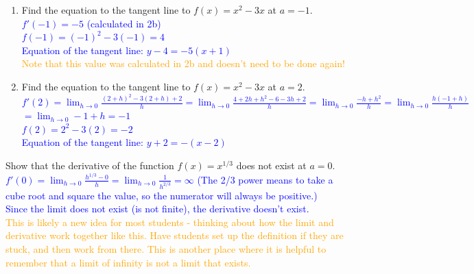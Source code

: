 \documentclass{ximera}
\begin{document}
    \begin{exercise} 
        \begin{enumerate}
            \item Find the equation to the tangent line to $f(x)=x^2-3x$ at $a=-1$.\\
            \textcolor{blue}{$f'(-1)=-5$ (calculated in 2b)\\
                $f(-1)=(-1)^2-3(-1)=4$\\
                Equation of the tangent line: $y-4=-5(x+1)$}\\
            \textcolor{orange}{Note that this value was calculated in 2b and doesn't need to be done again! }
            \item Find the equation to the tangent line to $f(x)=x^2-3x$ at $a=2$.\\
            \textcolor{blue}{$f'(2)=\displaystyle\lim_{h\rightarrow 0}\frac{(2+h)^2-3(2+h)+2}{h}=\lim_{h\rightarrow 0}\frac{4+2h+h^2-6-3h+2}{h}=\lim_{h\rightarrow 0}\frac{-h+h^2}{h}=\lim_{h\rightarrow 0}\frac{h(-1+h)}{h}$\\
            $=\displaystyle \lim_{h\rightarrow 0} -1+h=-1$\\
            $f(2)=2^2-3(2)=-2$\\
            Equation of the tangent line: $y+2=-(x-2)$}
        \end{enumerate}
    \end{exercise}

    \begin{exercise}
        Show that the derivative of the function $f(x)=x^{1/3}$ does not exist at $a=0$.\\
        \textcolor{blue}{$f'(0)=\displaystyle\lim_{h\rightarrow 0} \frac{h^{1/3}-0}{h}=\lim_{h\rightarrow 0}\frac{1}{h^{2/3}}=\infty$ (The 2/3 power means to take a cube root and square the value, so the numerator will always be positive.) \\
        Since the limit does not exist (is not finite), the derivative doesn't exist.}\\
        \textcolor{orange}{This is likely a new idea for most students - thinking about how the limit and derivative work together like this.  Have students set up the definition if they are stuck, and then work from there.  This is another place where it is helpful to remember that a limit of infinity is not a limit that exists.}
    \end{exercise}
   
\end{document}
